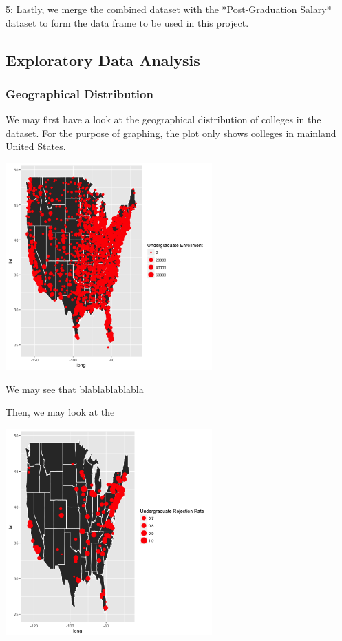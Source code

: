 \documentclass{article}\usepackage[]{graphicx}\usepackage[]{color}
\newenvironment{knitrout}{}{} %
\begin{document}
5: Lastly, we merge the combined dataset with the *Post-Graduation Salary* dataset to form the data frame to be used in this project. 

\subsection{Exploratory Data Analysis}

\subsubsection{Geographical Distribution}
We may first have a look at the geographical distribution of colleges in the dataset. For the purpose of graphing, the plot only shows colleges in mainland United States.

\begin{knitrout}
\color{fgcolor}

{\centering \includegraphics[width=300px]{../images/ggplot-schoolDistribution} 

}



\end{knitrout}

We may see that blablablablabla


Then, we may look at the 
\begin{knitrout}
\color{fgcolor}

{\centering \includegraphics[width=300px]{../images/ggplot-admissionRateDistribution} 

}



\end{knitrout}
\end{document}
